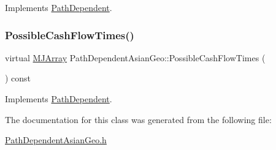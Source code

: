 Implements \hyperlink{classPathDependent_a1ee091a4f3680339683af087dfb4ca0f}{Path\+Dependent}.

\hypertarget{classPathDependentAsianGeo_ad8112de6219127c31de11d5774e80374}{}\label{classPathDependentAsianGeo_ad8112de6219127c31de11d5774e80374} 
\subsubsection{\texorpdfstring{Possible\+Cash\+Flow\+Times()}{PossibleCashFlowTimes()}}
{\footnotesize\ttfamily virtual \hyperlink{classMJArray}{M\+J\+Array} Path\+Dependent\+Asian\+Geo\+::\+Possible\+Cash\+Flow\+Times (\begin{DoxyParamCaption}{ }\end{DoxyParamCaption}) const\hspace{0.3cm}{\ttfamily [virtual]}}



Implements \hyperlink{classPathDependent_a4c8bf82be7f4443c5c8177d7500d542d}{Path\+Dependent}.



The documentation for this class was generated from the following file\+:\begin{DoxyCompactItemize}
\item 
\hyperlink{PathDependentAsianGeo_8h}{Path\+Dependent\+Asian\+Geo.\+h}\end{DoxyCompactItemize}
